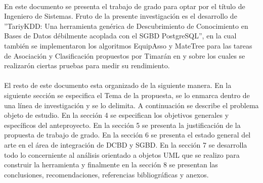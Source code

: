 \\
En este documento se presenta el trabajo de grado para optar por el t\'itulo de Ingeniero de Sistemas. Fruto de la presente investigaci\'on es el desarrollo de ''TariyKDD: Una herramienta gen\'erica de Descubrimiento de Conocimiento en Bases de Datos d\'ebilmente acoplada con el SGBD PostgreSQL'',  en la cual tambi\'en se implementaron los algoritmos EquipAsso \cite{33, 34, 35} y MateTree \cite{35} para las tareas de Asociaci\'on y Clasificaci\'on propuestos por Timar\'an en \cite{35} y sobre los cuales se realizar\'on ciertas pruebas para medir su rendimiento.\\
\\
El resto de este documento esta organizado de la siguiente manera. En la siguiente secci\'on se especifica el Tema de la propuesta, se lo enmarca dentro de una l\'inea de investigaci\'on y se lo delimita. A continuaci\'on se describe el problema objeto de estudio. En la secci\'on 4  se especifican los objetivos generales y espec\'ificos del anteproyecto. En la secci\'on 5 se presenta la justificaci\'on de la propuesta de trabajo de grado. En la secci\'on 6 se presenta el  estado general del arte en el \'area de integraci\'on de DCBD y SGBD. En la secci\'on 7 se desarrolla todo lo concerniente al an\'alisis orientado a objetos UML que se realizo para construir la herramienta y finalmente en la secci\'on 8 se presentan las conclusiones, recomendaciones, referencias bibliogr\'aficas y anexos.
